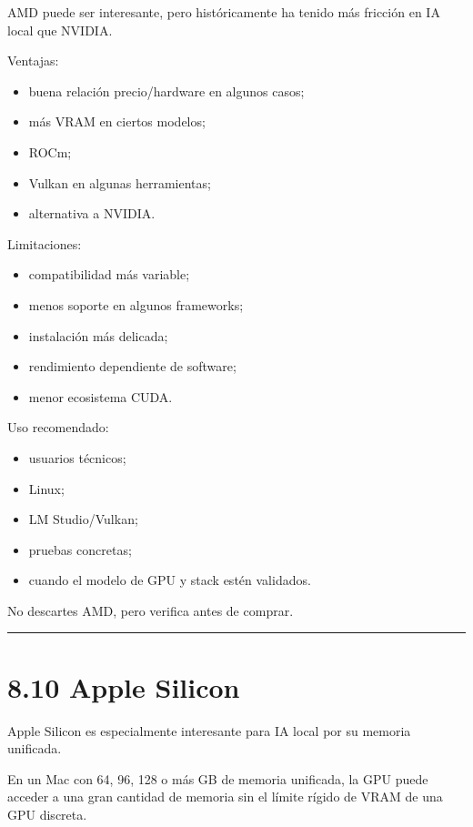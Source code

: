 AMD puede ser interesante, pero históricamente ha tenido más fricción en
IA local que NVIDIA.

Ventajas:

\begin{itemize}
\tightlist
\item
  buena relación precio/hardware en algunos casos;
\item
  más VRAM en ciertos modelos;
\item
  ROCm;
\item
  Vulkan en algunas herramientas;
\item
  alternativa a NVIDIA.
\end{itemize}

Limitaciones:

\begin{itemize}
\tightlist
\item
  compatibilidad más variable;
\item
  menos soporte en algunos frameworks;
\item
  instalación más delicada;
\item
  rendimiento dependiente de software;
\item
  menor ecosistema CUDA.
\end{itemize}

Uso recomendado:

\begin{itemize}
\tightlist
\item
  usuarios técnicos;
\item
  Linux;
\item
  LM Studio/Vulkan;
\item
  pruebas concretas;
\item
  cuando el modelo de GPU y stack estén validados.
\end{itemize}

No descartes AMD, pero verifica antes de comprar.

\begin{center}\rule{0.5\linewidth}{0.5pt}\end{center}

\section{8.10 Apple Silicon}\label{apple-silicon}

Apple Silicon es especialmente interesante para IA local por su memoria
unificada.

En un Mac con 64, 96, 128 o más GB de memoria unificada, la GPU puede
acceder a una gran cantidad de memoria sin el límite rígido de VRAM de
una GPU discreta.

